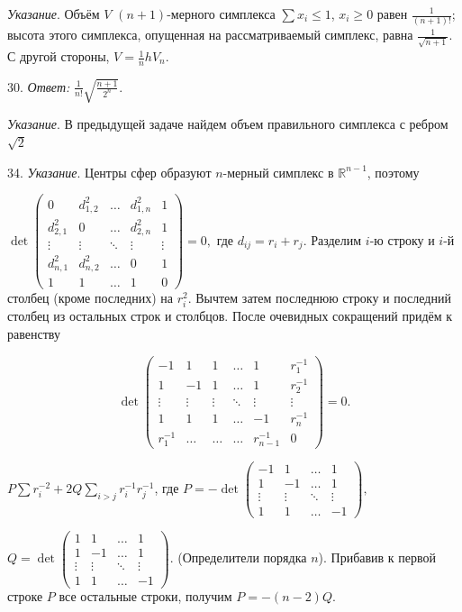 	\textit{Указание}. Объём $V$ $(n+1)$-мерного симплекса $\sum x_i \le 1$, $x_i \ge 0$ равен $\frac{1}{(n+1)!}$; высота этого симплекса, опущенная на рассматриваемый симплекс, равна $\frac{1}{\sqrt{n+1}}$. С другой стороны, $V = \frac{1}{n} h V_n$.

	30. \textit{Ответ:} $\frac{1}{n!} \sqrt{\frac{n+1}{2^n}}$.

	\textit{Указание}. В предыдущей задаче найдем объем правильного симплекса с ребром $\sqrt{2}$

	34. \textit{Указание}. Центры сфер образуют $n$-мерный симплекс в $\mathbb{R}^{n-1}$, поэтому

	$ \det
	\begin{pmatrix}
		0 & d_{1,2}^2 & \dots & d_{1,n}^2 & 1 \\
		d_{2,1}^2 & 0 & \dots & d_{2,n}^2 & 1 \\
		\vdots & \vdots & \ddots & \vdots & \vdots \\
		d_{n,1}^2 & d_{n,2}^2 & \dots & 0 & 1 \\
		1 & 1 & \dots & 1 & 0
	\end{pmatrix}
	= 0,
	$
	где $d_{ij} = r_i + r_j$. Разделим $i$-ю строку и $i$-й столбец (кроме последних) на $r_i^2$. Вычтем затем последнюю строку и последний столбец из остальных строк и столбцов. После очевидных сокращений придём к равенству

	\[
		\det \begin{pmatrix}
			-1 & 1 & 1 & \dots & 1 & r_1^{-1} \\
			1 & -1 & 1 & \dots & 1 & r_2^{-1} \\
			\vdots & \vdots & \vdots & \ddots & \vdots & \vdots \\
			1 & 1 & 1 & \dots & -1 & r_n^{-1} \\
			r_1^{-1} & \dots & \dots & \dots & r_{n-1}^{-1} & 0
		\end{pmatrix} = 0.
	\]

	$P\sum r_i^{-2} + 2Q \sum_{i > j} r_i^{-1} r_j^{-1}$, где $P = -\det
	\begin{pmatrix}
		-1 & 1 & \dots & 1 \\
		1 & -1 & \dots & 1 \\ 
		\vdots & \vdots & \ddots & \vdots \\
		1 & 1 & \dots & -1
	\end{pmatrix},$

	$Q = \det
	\begin{pmatrix}
		1 & 1 & \dots & 1 \\
		1 & -1 & \dots & 1 \\ 
		\vdots & \vdots & \ddots & \vdots \\
		1 & 1 & \dots & -1
	\end{pmatrix}$. (Определители порядка $n$). Прибавив к первой строке $P$ все остальные строки, получим $P = -(n-2)Q$.

